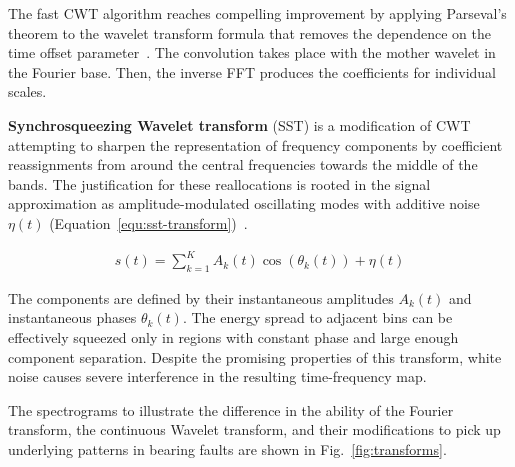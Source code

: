 The fast CWT algorithm reaches compelling improvement by applying Parseval's theorem to the wavelet transform formula that removes the dependence on the time offset parameter~\cite{arts_fast_2022}. The convolution takes place with the mother wavelet in the Fourier base. Then, the inverse FFT produces the coefficients for individual scales.

\textbf{Synchrosqueezing Wavelet transform} (SST) is a modification of CWT attempting to sharpen the representation of frequency components by coefficient reassignments from around the central frequencies towards the middle of the bands. The justification for these reallocations is rooted in the signal approximation as amplitude-modulated oscillating modes with additive noise $\eta(t)$ (Equation~\ref{equ:sst-transform})~\cite{herrera_applications_2014}.

\begin{ceqn}\begin{align}
s(t) = \sum_{k=1}^{K} A_k(t)\cos(\theta_k(t)) + \eta(t)
\label{equ:sst-transform}
\end{align}\end{ceqn}

The components are defined by their instantaneous amplitudes $A_k(t)$ and instantaneous phases $\theta_k(t)$. The energy spread to adjacent bins can be effectively squeezed only in regions with constant phase and large enough component separation. Despite the promising properties of this transform, white noise causes severe interference in the resulting time-frequency map.

The spectrograms to illustrate the difference in the ability of the Fourier transform, the continuous Wavelet transform, and their modifications to pick up underlying patterns in bearing faults are shown in Fig.~\ref{fig:transforms}.

